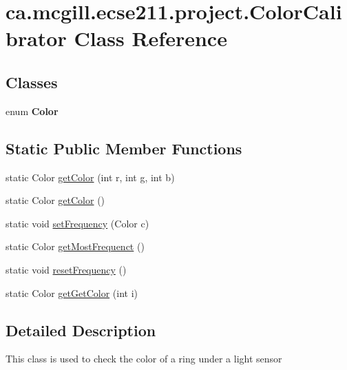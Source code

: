\hypertarget{classca_1_1mcgill_1_1ecse211_1_1project_1_1_color_calibrator}{}\section{ca.\+mcgill.\+ecse211.\+project.\+Color\+Calibrator Class Reference}
\label{classca_1_1mcgill_1_1ecse211_1_1project_1_1_color_calibrator}
\subsection*{Classes}
\begin{DoxyCompactItemize}
\item 
enum {\bfseries Color}
\end{DoxyCompactItemize}
\subsection*{Static Public Member Functions}
\begin{DoxyCompactItemize}
\item 
static Color \hyperlink{classca_1_1mcgill_1_1ecse211_1_1project_1_1_color_calibrator_a92e653a6a9f7a31cb7b6f9bc2e732133}{get\+Color} (int r, int g, int b)
\item 
static Color \hyperlink{classca_1_1mcgill_1_1ecse211_1_1project_1_1_color_calibrator_a1acf05f9523b2c0f329d4a7cbf1b9c47}{get\+Color} ()
\item 
static void \hyperlink{classca_1_1mcgill_1_1ecse211_1_1project_1_1_color_calibrator_a40906193773ead0bfd582f188413c97a}{set\+Frequency} (Color c)
\item 
static Color \hyperlink{classca_1_1mcgill_1_1ecse211_1_1project_1_1_color_calibrator_a3d65927aaa2041f933dbdc19c3d2a412}{get\+Most\+Frequenct} ()
\item 
static void \hyperlink{classca_1_1mcgill_1_1ecse211_1_1project_1_1_color_calibrator_ab6148d75e3a105016580e90ed1ea9bc9}{reset\+Frequency} ()
\item 
static Color \hyperlink{classca_1_1mcgill_1_1ecse211_1_1project_1_1_color_calibrator_acb1d9cef0739971dbe00cc16712be0fe}{get\+Get\+Color} (int i)
\end{DoxyCompactItemize}


\subsection{Detailed Description}
This class is used to check the color of a ring under a light sensor

